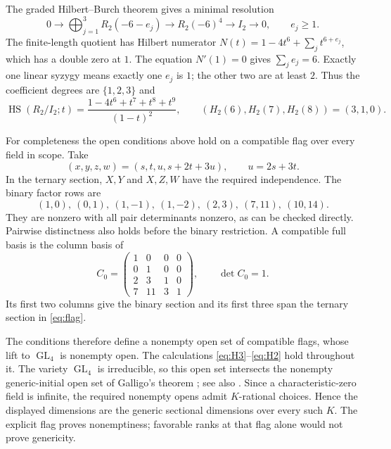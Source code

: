 \documentclass[11pt]{article}
\newcommand{\HS}{\operatorname{HS}}
\newcommand{\GL}{\operatorname{GL}}
\begin{document}
The graded Hilbert--Burch theorem \cite{Burch} gives a minimal resolution
\[
 0\longrightarrow\bigoplus_{j=1}^3R_2(-6-e_j)
 \longrightarrow R_2(-6)^4\longrightarrow I_2\longrightarrow0,
 \qquad e_j\geq1.
\]
The finite-length quotient has Hilbert numerator
$N(t)=1-4t^6+\sum_jt^{6+e_j}$, which has a double zero at $1$.
The equation $N'(1)=0$ gives $\sum_je_j=6$. Exactly one linear syzygy
means exactly one $e_j$ is $1$; the other two are at least $2$.
Thus the coefficient degrees are $\{1,2,3\}$ and
\begin{equation}\label{eq:H2}
 \HS(R_2/I_2;t)=\frac{1-4t^6+t^7+t^8+t^9}{(1-t)^2},\qquad
 (H_2(6),H_2(7),H_2(8))=(3,1,0).
\end{equation}

For completeness the open conditions above hold on a compatible flag over
every field in scope. Take
\begin{equation}\label{eq:flag}
 (x,y,z,w)=(s,t,u,s+2t+3u),\qquad u=2s+3t.
\end{equation}
In the ternary section, $X,Y$ and $X,Z,W$ have the required independence.
The binary factor rows are
\[
 (1,0),\ (0,1),\ (1,-1),\ (1,-2),\ (2,3),\ (7,11),\ (10,14).
\]
They are nonzero with all pair determinants nonzero, as can be checked
directly. Pairwise distinctness also holds before the binary restriction.
A compatible full basis is the column basis of
\[
 C_0=\begin{pmatrix}
 1&0&0&0\\0&1&0&0\\2&3&1&0\\7&11&3&1
 \end{pmatrix},\qquad\det C_0=1.
\]
Its first two columns give the binary section and its first three span the
ternary section in \eqref{eq:flag}.

The conditions therefore define a nonempty open set of compatible flags,
whose lift to $\GL_4$ is nonempty open. The calculations
\eqref{eq:H3}--\eqref{eq:H2} hold throughout it. The variety $\GL_4$ is
irreducible, so this open set intersects the nonempty generic-initial open
set of Galligo's theorem \cite{Galligo}; see also \cite[Theorem 4.4]{BPT}.
Since a characteristic-zero field is infinite, the required nonempty opens
admit $K$-rational choices. Hence the displayed dimensions are the generic
sectional dimensions over every such $K$. The explicit flag proves
nonemptiness; favorable ranks at that flag alone would not prove genericity.
\end{document}
